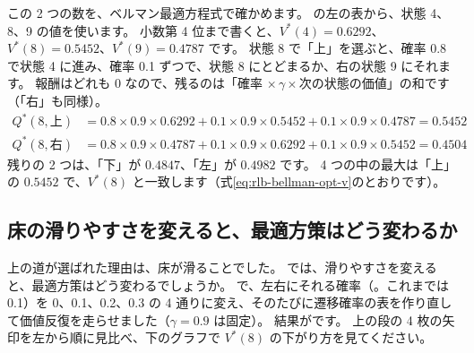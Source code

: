 この 2 つの数を、ベルマン最適方程式で確かめます。
の左の表から、状態 4、8、9 の値を使います。
小数第 4 位まで書くと、$V^\ast(4)=0.6292$、$V^\ast(8)=0.5452$、$V^\ast(9)=0.4787$ です。
状態 8 で「上」を選ぶと、確率 0.8 で状態 4 に進み、確率 0.1 ずつで、状態 8 にとどまるか、右の状態 9 にそれます。
報酬はどれも 0 なので、残るのは「確率 $\times\,\gamma\times$次の状態の価値」の和です（「右」も同様）。
\begin{align*}
Q^\ast(8,\text{上})&=0.8\times0.9\times0.6292+0.1\times0.9\times0.5452+0.1\times0.9\times0.4787=0.5452\\
Q^\ast(8,\text{右})&=0.8\times0.9\times0.4787+0.1\times0.9\times0.6292+0.1\times0.9\times0.5452=0.4504
\end{align*}
残りの 2 つは、「下」が $0.4847$、「左」が $0.4982$ です。
4 つの中の最大は「上」の $0.5452$ で、$V^\ast(8)$ と一致します（式\eqref{eq:rlb-bellman-opt-v}のとおりです）。

\subsection*{床の滑りやすさを変えると、最適方策はどう変わるか}

上の道が選ばれた理由は、床が滑ることでした。
では、滑りやすさを変えると、最適方策はどう変わるでしょうか。
 で、左右にそれる確率（。これまでは 0.1）を 0、0.1、0.2、0.3 の 4 通りに変え、そのたびに遷移確率の表を作り直して価値反復を走らせました（$\gamma=0.9$ は固定）。
結果がです。
上の段の 4 枚の矢印を左から順に見比べ、下のグラフで $V^\ast(8)$ の下がり方を見てください。

